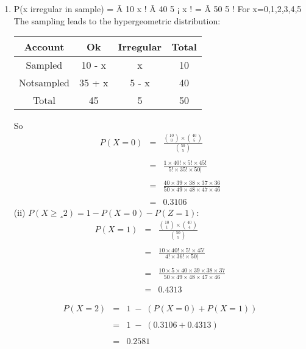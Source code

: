 \documentclass[a4paper,12pt]{article}
\begin{document}
\begin{enumerate}
\item P(x irregular in sample) =
Ã
10
x
! Ã
40
5 ¡ x
!
=
Ã
50
5
!
For x=0,1,2,3,4,5
The sampling leads to the hypergeometric distribution:

\begin{center}
\begin{tabular}{|c|c|c||c|} \hline
Account & Ok & Irregular &  Total\\ \hline
Sampled & 10 - x & x & 10\\ \hline 
Notsampled & 35 + x & 5 - x & 40\\ \hline  \hline
Total & 45 & 5 & 50 \\ \hline
\end{tabular}
\end{center}
So
\begin{eqnarray*}
P(X=0) &=& \frac{ {10 \choose 0} \times {40 \choose 5} }{ {50 \choose 5}}\\
& &  \\
&=& \frac{1 \times 40! \times 5!  \times 45!}{5! \times 35! \times 50|}\\
& &  \\
&=& \frac{ 40 \times 39 \times 38 \times 37 \times 36}{50 \times 49 \times 48 \times 47 \times 46}\\
& &  \\
&=& 0.3106
\end{eqnarray*}
(ii)
$P(X \geq¸ 2) = 1 - P(X = 0) - P(Z = 1):$
\begin{eqnarray*}
P(X=1) &=& \frac{ {10 \choose 1} \times {40 \choose 4} }{ {50 \choose 5}}\\
& &  \\
&=& \frac{10 \times 40! \times 5!  \times 45!}{4! \times 36! \times 50|}\\
& &  \\
&=& \frac{10 \times 5 \times 40 \times 39 \times 38 \times 37}{50 \times 49 \times 48 \times 47 \times 46}\\
& &  \\
&=& 0.4313
\end{eqnarray*}

\begin{eqnarray*}
P( X = 2) &=& 1\;-\; \left( P( X = 0) + P( X = 1) \right) \\
& & \\
&=& 1\;-\; \left( 0.3106 + 0.4313 \right) \\
& & \\
&=& 0.2581\\
\end{eqnarray*}


\end{enumerate}
\end{document}
